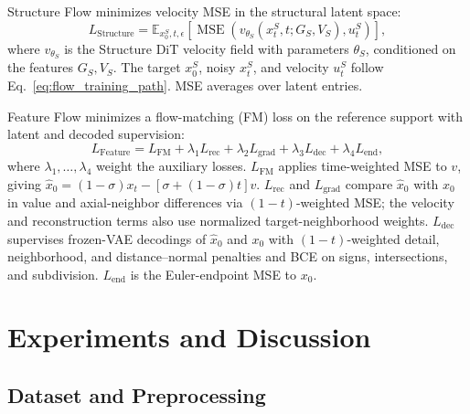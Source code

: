 \documentclass[preprint,review,12pt]{elsarticle}
\begin{document}
\hspace{2em}Structure Flow minimizes velocity MSE in the structural latent space:
\begin{equation}
L_{\mathrm{Structure}}
=\mathbb{E}_{x_0^S,t,\epsilon}
\left[
\operatorname{MSE}\!\left(
v_{\theta_S}(x_t^S,t;G_S,V_S),u_t^S
\right)
\right],
\label{eq:structure_training_objective}
\end{equation}
where \(v_{\theta_S}\) is the Structure DiT velocity field with parameters \(\theta_S\), conditioned on the features \(G_S, V_S\). The target \(x_0^S\), noisy \(x_t^S\), and velocity \(u_t^S\) follow Eq.~\eqref{eq:flow_training_path}. MSE averages over latent entries.


\hspace{2em}Feature Flow minimizes a flow-matching (FM) loss on the reference support with latent and decoded supervision:
\begin{equation}
L_{\mathrm{Feature}}=L_{\mathrm{FM}}+\lambda_1L_{\mathrm{rec}}
+\lambda_2L_{\mathrm{grad}}+\lambda_3L_{\mathrm{dec}}+\lambda_4L_{\mathrm{end}},
\label{eq:feature_training_objective}
\end{equation}
where \(\lambda_1,\ldots,\lambda_4\) weight the auxiliary losses. \(L_{\mathrm{FM}}\) applies time-weighted MSE to \(v\), giving \(\hat{x}_0=(1-\sigma)x_t-[\sigma+(1-\sigma)t]v\). \(L_{\mathrm{rec}}\) and \(L_{\mathrm{grad}}\) compare \(\hat{x}_0\) with \(x_0\) in value and axial-neighbor differences via \((1-t)\)-weighted MSE; the velocity and reconstruction terms also use normalized target-neighborhood weights. \(L_{\mathrm{dec}}\) supervises frozen-VAE decodings of \(\hat{x}_0\) and \(x_0\) with \((1-t)\)-weighted detail, neighborhood, and distance--normal penalties and BCE on signs, intersections, and subdivision. \(L_{\mathrm{end}}\) is the Euler-endpoint MSE to \(x_0\).

\section{Experiments and Discussion}\label{sec4}

\subsection{Dataset and Preprocessing}\label{subsec4_1}
\end{document}
